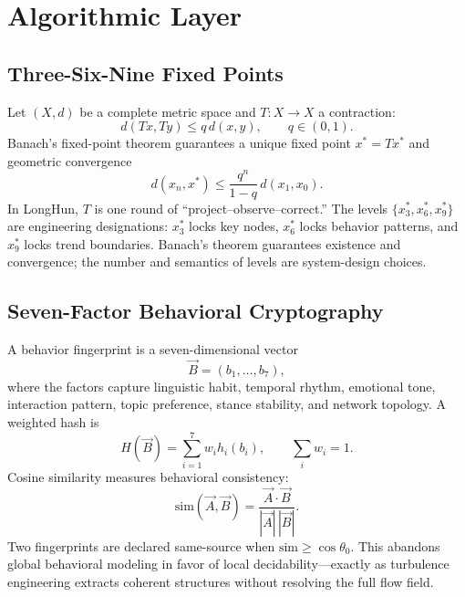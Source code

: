 \documentclass[10pt,a4paper]{article}
\theoremstyle{definition}
\begin{document}
\section{Algorithmic Layer}\label{sec:algorithms}

\subsection{Three-Six-Nine Fixed Points}

Let $(X,d)$ be a complete metric space and $T:X\to X$ a contraction:
\begin{equation}\label{eq:contraction}
d(Tx,Ty) \le q\,d(x,y), \qquad q\in(0,1).
\end{equation}
Banach's fixed-point theorem\cite{Banach1922} guarantees a unique fixed point $x^*=Tx^*$ and geometric convergence
\begin{equation}\label{eq:banach-bound}
d(x_n,x^*) \le \frac{q^n}{1-q}\,d(x_1,x_0).
\end{equation}
In LongHun, $T$ is one round of ``project--observe--correct.'' The levels $\{x^*_3,x^*_6,x^*_9\}$ are engineering designations: $x^*_3$ locks key nodes, $x^*_6$ locks behavior patterns, and $x^*_9$ locks trend boundaries. Banach's theorem guarantees existence and convergence; the number and semantics of levels are system-design choices.

\subsection{Seven-Factor Behavioral Cryptography}

A behavior fingerprint is a seven-dimensional vector
\begin{equation}\label{eq:fingerprint}
\vec{B} = (b_1,\dots,b_7),
\end{equation}
where the factors capture linguistic habit, temporal rhythm, emotional tone, interaction pattern, topic preference, stance stability, and network topology. A weighted hash is
\begin{equation}\label{eq:hash}
H(\vec{B}) = \sum_{i=1}^{7} w_i h_i(b_i), \qquad \sum_i w_i=1.
\end{equation}
Cosine similarity measures behavioral consistency:
\begin{equation}\label{eq:cosine}
\mathrm{sim}(\vec{A},\vec{B}) = \frac{\vec{A}\cdot\vec{B}}{|\vec{A}|\,|\vec{B}|}.
\end{equation}
Two fingerprints are declared same-source when $\mathrm{sim}\ge \cos\theta_0$. This abandons global behavioral modeling in favor of local decidability---exactly as turbulence engineering extracts coherent structures without resolving the full flow field.
\end{document}
